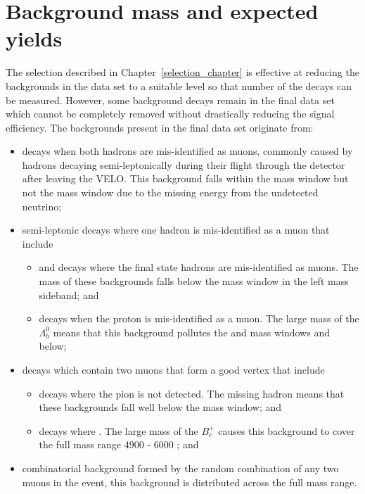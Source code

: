 \section{Background mass \pdfs and expected yields}
\label{sec:backgrounds}
The selection described in Chapter~\ref{selection_chapter} is effective at reducing the backgrounds in the data set to a suitable level so that number of the \bmumu decays can be measured. However, some background decays remain in the final data set which cannot be completely removed without drastically reducing the signal efficiency. %
The backgrounds present in the final data set originate from:
\begin{itemize}
\item \bhh decays when both hadrons are mis-identified as muons, commonly caused by hadrons decaying semi-leptonically during their flight through the detector after leaving the VELO. This background falls within the \bd mass window but not the \bs mass window due to the missing energy from the undetected neutrino;
\item semi-leptonic decays where one hadron is mis-identified as a muon that include
\begin{itemize}
\item \bdpimunu and \bsKmunu decays where the final state hadrons are mis-identified as muons. The mass of these backgrounds falls below the \bd mass window in the left mass sideband; and
\item \lambdab decays when the proton is mis-identified as a muon. The large mass of the $\Lambda^{0}_{b}$ means that this background pollutes the \bs and \bd mass windows and below;
\end{itemize}
\item decays which contain two muons that form a good vertex that include
\begin{itemize}
\item \bpimumu decays where the pion is not detected. The missing hadron means that these backgrounds fall well below the \bd mass window; and
\item \bcjpsimunu decays where \jpsimumu. The large mass of the $B^{+}_{c}$ causes this background to cover the full mass range 4900 - 6000 \mevcc; and
\end{itemize}
\item combinatorial background formed by the random combination of any two muons in the event, this background is distributed across the full mass range.
\end{itemize}

